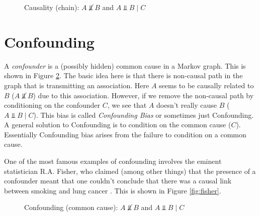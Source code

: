 \documentclass[11pt, oneside]{article}   	%
\begin{document}
\begin{figure}[b!]
\caption{Causality (chain): $A \not \Vbar B$ and $A \Vbar B \mid C$}
\label{fig:direct}
\end{figure}


\section{Confounding}

A  \emph{confounder} is a (possibly hidden) common cause in a Markov graph. This is shown in Figure \ref{fig:confounding}. The basic idea
here is that there is non-causal path in the graph that is transmitting an association. Here $A$ seems to be causally related to  $B$ ($A \not \Vbar B$) due
to this association.  However, if we remove the non-causal path by conditioning on the confounder $C$, we see that $A$ doesn't really cause  
$B$ ($A \Vbar B \mid C$).  This bias is called \emph{Confounding Bias} or 
sometimes just Confounding.  A  general solution to Confounding is to condition on the common cause ($C$).  Essentially Confounding bias arises from
the failure to condition on a common cause.

\bigskip
\noindent
One of the most famous examples of confounding involves the eminent statistician R.A. Fisher, who claimed (among other things) that the presence of a 
confounder meant that one couldn't conclude that there was a causal link between smoking and lung cancer \cite{FISHER1958}. This is shown in 
Figure \ref{fig:fisher}.

\begin{figure}
\caption{Confounding (common cause): $A \not \Vbar B$ and $A \Vbar B \mid C$}
\label{fig:confounding}
\end{figure}
\end{document}
